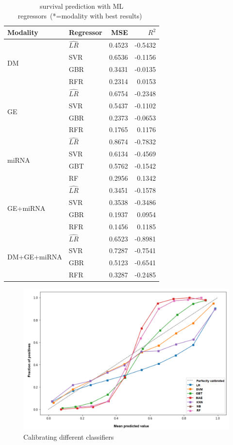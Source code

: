\begin{table}[htp!]
	\renewcommand{\arraystretch}{0.9}
	\caption{survival prediction with ML regressors~(*=modality with best results)~\cite{karimACCESS2019}}
	\label{table:regression}
	\scriptsize
	\vspace{-2mm}
	\centering
	\begin{tabular}{p{2.8cm}|l|r|r}
		\toprule
		\textbf{Modality} & \textbf{Regressor} & \textbf{MSE} & \textbf{$R^2$} \\ \hline
		\multirow{4}{*}{DM} & $\hat{LR}$ & 0.4523 & -0.5432 \\
		& SVR & 0.6536 & -0.1156 \\
		& GBR & 0.3431 & -0.0135\\
		& RFR & 0.2314 & 0.0153\\
		\hline
		\multirow{4}{*}{GE} & $\hat{LR}$ & 0.6754 & -0.2348 \\
		& SVR & 0.5437 & -0.1102  \\
		& GBR & 0.2373 & -0.0653 \\
		& RFR & 0.1765 & 0.1176 \\
		\hline
		\multirow{4}{*}{miRNA} & $\hat{LR}$ & 0.8674 & -0.7832  \\
		& SVR & 0.6134 & -0.4569  \\
		& GBT & 0.5762 & -0.1542 \\
		& RF & 0.2956 & 0.1342\\
		\hline
		\multirow{4}{*}{GE+miRNA} & $\hat{LR}$ & 0.3451 & -0.1578  \\
		& SVR & 0.3538 & -0.3486  \\
		& GBR & 0.1937 & 0.0954 \\
		& RFR & 0.1456 & 0.1185 \\
		\hline
		\multirow{4}{*}{DM+GE+miRNA} & $\hat{LR}$ & 0.6523 & -0.8981 \\
		& SVR & 0.7287 & -0.7541  \\
		& GBR & 0.5123 & -0.6541 \\
		& RFR & 0.3287 & -0.2485 \\
        \hline
	\end{tabular}
\end{table}

\begin{figure}[htp!]
	\centering
	\includegraphics[width=0.8\linewidth]{images/cali.png}	
	\caption{Calibrating different classifiers~\cite{karimACCESS2019}}	
	\label{fig:cal}
\end{figure}


